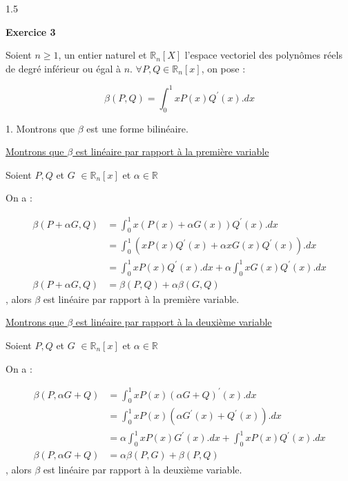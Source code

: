 \documentclass[12pt]{article}
\begin{document}
\begin{spacing}{1.5}
\begin{center}
{
}
\end{center} 

\medskip
\textbf{Exercice 3}

Soient $n\geq 1$, un entier naturel et $\mathbb{R}_n[X]$ l'espace vectoriel des polynômes réels de degré inférieur ou égal à $n$. $\forall {P,Q\in \mathbb{R}_n[x]}$, on pose :

\[ \beta(P,Q)=\int_{0}^{1}xP(x)Q^{\prime}(x). dx\]

1. Montrons que $\beta$ est une forme bilinéaire.

\underline{Montrons que $\beta$ est linéaire par rapport à la première variable}

Soient $P,Q$ et $G$ $\in \mathbb{R}_n[x]$ et $\alpha\in \mathbb{R}$

On a :

\begin{align*}
\beta(P+\alpha G,Q) &=\int_{0}^{1}x(P(x)+\alpha G(x)) Q^{\prime}(x).dx\\
&=\int_{0}^{1}(xP(x)Q^{\prime}(x)+\alpha xG(x)Q^{\prime}(x)).dx\\
&=\int_{0}^{1}xP(x)Q^{\prime}(x).dx+\alpha\int_{0}^{1}xG(x)Q^{\prime}(x).dx\\
\beta(P+\alpha G,Q) &=\beta(P,Q)+\alpha\beta(G,Q)
\end{align*}, alors $\beta$ est linéaire par rapport à la première variable.

 \medskip
 \underline{Montrons que $\beta$ est linéaire par rapport à la deuxième variable}
 
 Soient $P,Q$ et $G$ $\in \mathbb{R}_n[x]$ et $\alpha\in \mathbb{R}$
 
 On a :

\begin{align*}
\beta(P,\alpha G+Q)&=\int_{0}^{1}xP(x)(\alpha G + Q)^{\prime}(x). dx\\
&=\int_{0}^{1}xP(x)(\alpha G^{\prime}(x) + Q^{\prime}(x)). dx\\
&=\alpha\int_{0}^{1}xP(x)G^{\prime}(x).dx+\int_{0}^{1}xP(x)Q^{\prime}(x). dx\\
\beta(P,\alpha G+Q)&=\alpha\beta(P,G)+\beta(P,Q)
\end{align*}, alors $\beta$ est linéaire par rapport à la deuxième variable.


\end{spacing}
\end{document}
